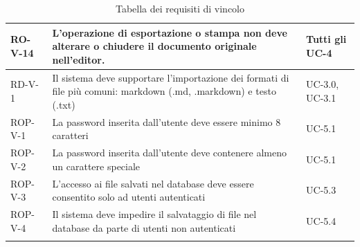 \documentclass[11pt,a4paper]{article}
\begin{document}
\begin{longtable}{|p{}|>{\raggedright\arraybackslash}p{}|p{}|}
\hline
RO-V-14 & L'operazione di esportazione o stampa non deve alterare o chiudere il documento originale nell'editor. & Tutti gli UC-4 \\
\hline
RD-V-1 & Il sistema deve supportare l'importazione dei formati di file più comuni: markdown (.md, .markdown) e testo (.txt) & UC-3.0, UC-3.1 \\
\hline
ROP-V-1 & La password inserita dall'utente deve essere minimo 8 caratteri & UC-5.1 \\
\hline
ROP-V-2 & La password inserita dall'utente deve contenere almeno un carattere speciale & UC-5.1 \\
\hline
ROP-V-3 & L'accesso ai file salvati nel database deve essere consentito solo ad utenti autenticati & UC-5.3 \\
\hline
ROP-V-4 & Il sistema deve impedire il salvataggio di file nel database da parte di utenti non autenticati & UC-5.4 \\
\hline
\addlinespace[1em]
\caption{Tabella dei requisiti di vincolo}
\end{longtable}


\newpage
\end{document}
